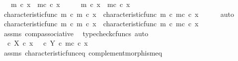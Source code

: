\begin{isabellebody}
\ \ \ {\isachardoublequoteopen}m\ {\isasymcirc}\isactrlsub c\ x\ {\isasymnoteq}\ m\isactrlsup c\ {\isasymcirc}\isactrlsub c\ x{\isacharprime}{\kern0pt}{\isachardoublequoteclose}\isanewline
%
\isadelimproof
%
\endisadelimproof
%
\isatagproof
{}\isamarkupfalse%
\ \isanewline
\ \ \isamarkupfalse%
\ {\isachardoublequoteopen}m\ {\isasymcirc}\isactrlsub c\ x\ {\isacharequal}{\kern0pt}\ m\isactrlsup c\ {\isasymcirc}\isactrlsub c\ x{\isacharprime}{\kern0pt}{\isachardoublequoteclose}\isanewline
\ \ \isamarkupfalse%
\ \isamarkupfalse%
\ {\isachardoublequoteopen}characteristic{\isacharunderscore}{\kern0pt}func\ m\ {\isasymcirc}\isactrlsub c\ m\ {\isasymcirc}\isactrlsub c\ x\ {\isacharequal}{\kern0pt}\ characteristic{\isacharunderscore}{\kern0pt}func\ m\ {\isasymcirc}\isactrlsub c\ m\isactrlsup c\ {\isasymcirc}\isactrlsub c\ x{\isacharprime}{\kern0pt}{\isachardoublequoteclose}\isanewline
\ \ \ \ \isamarkupfalse%
\ auto\isanewline
\ \ \isamarkupfalse%
\ \isamarkupfalse%
\ {\isachardoublequoteopen}{\isacharparenleft}{\kern0pt}characteristic{\isacharunderscore}{\kern0pt}func\ m\ {\isasymcirc}\isactrlsub c\ m{\isacharparenright}{\kern0pt}\ {\isasymcirc}\isactrlsub c\ x\ {\isacharequal}{\kern0pt}\ {\isacharparenleft}{\kern0pt}characteristic{\isacharunderscore}{\kern0pt}func\ m\ {\isasymcirc}\isactrlsub c\ m\isactrlsup c{\isacharparenright}{\kern0pt}\ {\isasymcirc}\isactrlsub c\ x{\isacharprime}{\kern0pt}{\isachardoublequoteclose}\isanewline
\ \ \ \ \isamarkupfalse%
\ assms\ comp{\isacharunderscore}{\kern0pt}associative{}\ \isamarkupfalse%
\ {\isacharparenleft}{\kern0pt}typecheck{\isacharunderscore}{\kern0pt}cfuncs{\isacharcomma}{\kern0pt}\ auto{\isacharparenright}{\kern0pt}\isanewline
\ \ \isamarkupfalse%
\ \isamarkupfalse%
\ {\isachardoublequoteopen}{\isacharparenleft}{\kern0pt}{\isasymt}\ {\isasymcirc}\isactrlsub c\ {\isasymbeta}\isactrlbsub X\isactrlesub {\isacharparenright}{\kern0pt}\ {\isasymcirc}\isactrlsub c\ x\ {\isacharequal}{\kern0pt}\ {\isacharparenleft}{\kern0pt}{\isacharparenleft}{\kern0pt}{\isasymf}\ {\isasymcirc}\isactrlsub c\ {\isasymbeta}\isactrlbsub Y\isactrlesub {\isacharparenright}{\kern0pt}\ {\isasymcirc}\isactrlsub c\ m\isactrlsup c{\isacharparenright}{\kern0pt}\ {\isasymcirc}\isactrlsub c\ x{\isacharprime}{\kern0pt}{\isachardoublequoteclose}\isanewline
\ \ \ \ \isamarkupfalse%
\ assms\ characteristic{\isacharunderscore}{\kern0pt}func{\isacharunderscore}{\kern0pt}eq\ complement{\isacharunderscore}{\kern0pt}morphism{\isacharunderscore}{\kern0pt}eq\ \isamarkupfalse%

\end{isabellebody}
